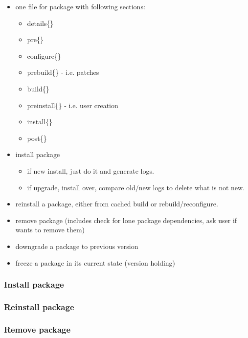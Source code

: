 \begin{itemize}
\item one file for package with following sections:

\begin{itemize}
\item details\{\}
\item pre\{\}
\item configure\{\}
\item prebuild\{\} - i.e. patches
\item build\{\}
\item preinstall\{\} - i.e. user creation
\item install\{\}
\item post\{\}
\end{itemize}

\item install package
 
	\begin{itemize}
			\item if new install, just do it and generate logs.
			\item if upgrade, install over, compare old/new logs to delete what is not new.
	\end{itemize}

\item reinstall a package, either from cached build or rebuild/reconfigure.
\item remove package (includes check for lone package dependencies, ask user if wants to remove them)
\item downgrade a package to previous version
\item freeze a package in its current state (version holding)
\end{itemize}

%
%
\subsubsection{Install package}


\newpage
\subsubsection{Reinstall package}


\newpage
\subsubsection{Remove package}


